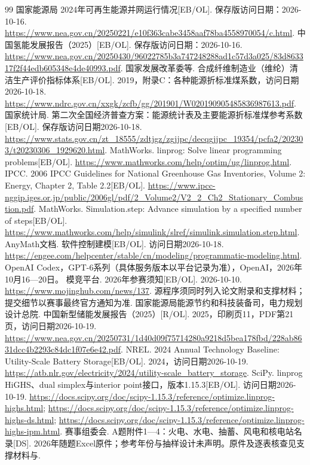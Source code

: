 \begin{thebibliography}{99}
 国家能源局 2024年可再生能源并网运行情况[EB/OL]. 保存版访问日期：2026-10-16. \url{https://www.nea.gov.cn/20250221/e10f363cabe3458aaf78ba4558970054/c.html}.
 中国氢能发展报告（2025）[EB/OL]. 保存版访问日期：2026-10-16. \url{https://www.nea.gov.cn/20250430/96022785b3a747248288ad1c57d3a025/83d863317f2f44edb605348e4de40993.pdf}.
 国家发展改革委等. 合成纤维制造业（维纶）清洁生产评价指标体系[EB/OL]. 2019，附录C：各种能源折标准煤系数，访问日期2026-10-18. \url{https://www.ndrc.gov.cn/xxgk/zcfb/gg/201901/W020190905485836987613.pdf}.
 国家统计局. 第二次全国经济普查方案：能源统计表及主要能源折标准煤参考系数[EB/OL]. 保存版访问日期2026-10-18. \url{https://www.stats.gov.cn/zt_18555/zdtjgz/zgjjpc/decqgjjpc_19354/pcfa2/202303/t20230306_1929620.html}.
 MathWorks. linprog: Solve linear programming problems[EB/OL]. \url{https://www.mathworks.com/help/optim/ug/linprog.html}.
 IPCC. 2006 IPCC Guidelines for National Greenhouse Gas Inventories, Volume 2: Energy, Chapter 2, Table 2.2[EB/OL]. \url{https://www.ipcc-nggip.iges.or.jp/public/2006gl/pdf/2_Volume2/V2_2_Ch2_Stationary_Combustion.pdf}.
 MathWorks. Simulation.step: Advance simulation by a specified number of steps[EB/OL]. \url{https://www.mathworks.com/help/simulink/slref/simulink.simulation.step.html}.
 AnyMath文档. 软件控制建模[EB/OL]. 访问日期2026-10-18. \url{https://engee.com/helpcenter/stable/cn/modeling/programmatic-modeling.html}.
 OpenAI Codex，GPT-6系列（具体服务版本以平台记录为准），OpenAI，2026年10月16—20日。
 模竞平台. 2026年参赛须知[EB/OL]. 2026-10-10. \url{https://www.mojinghub.com/news/137}. 源程序须同时列入论文附录和支撑材料；提交细节以赛事最终官方通知为准.
 国家能源局能源节约和科技装备司，电力规划设计总院. 中国新型储能发展报告（2025）[R/OL]. 2025，印刷页11，PDF第21页，访问日期2026-10-19. \url{https://www.nea.gov.cn/20250731/1d40d09f75714280a9218d5bea178fbd/228ab8631dcc4b2293c84dc1f07e6e42.pdf}.
 NREL. 2024 Annual Technology Baseline: Utility-Scale Battery Storage[EB/OL]. 2024，访问日期2026-10-19. \url{https://atb.nlr.gov/electricity/2024/utility-scale_battery_storage}.
 SciPy. linprog HiGHS、dual simplex与interior point接口，版本1.15.3[EB/OL]. 访问日期2026-10-19. \url{https://docs.scipy.org/doc/scipy-1.15.3/reference/optimize.linprog-highs.html}; \url{https://docs.scipy.org/doc/scipy-1.15.3/reference/optimize.linprog-highs-ds.html}; \url{https://docs.scipy.org/doc/scipy-1.15.3/reference/optimize.linprog-highs-ipm.html}.
赛事组委会. A题附件1—4：火电、水电、抽蓄、风电和核电站名录[DS]. 2026年随题Excel原件；参考年份与抽样设计未声明。原件及逐表核查见支撑材料与.
\end{thebibliography}
\endgroup
